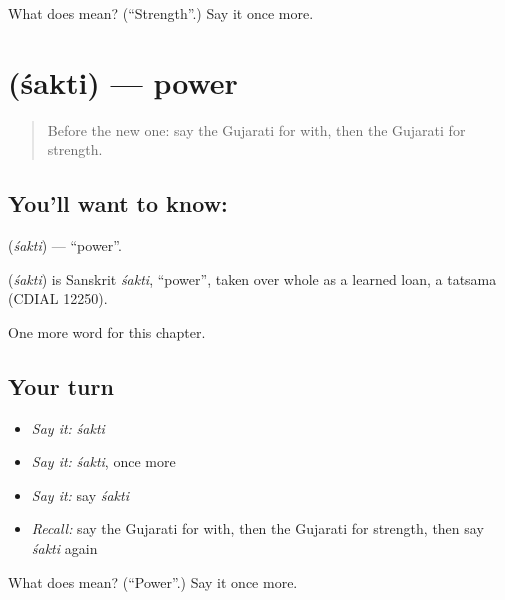 \begin{tcolorbox}[breakable,colback=teal!4,colframe=teal!35!black,title={Before you move on}]
What does  mean? (\textquotedblleft{}Strength\textquotedblright{}.) Say it once more.
\end{tcolorbox}
\section[\texorpdfstring{\gu{શક્તિ} (śakti)}{શક્તિ (śakti)}]{ (śakti) — power}

\label{lesson:GU-C102-sakti}



\begin{quote}
Before the new one: say the Gujarati for with, then the Gujarati for strength.
\end{quote}

\subsection*{You'll want to know: }
\textbf{} (\emph{śakti}) — \textquotedblleft{}power\textquotedblright{}.

\begin{cousinweb}
\textbf{} (\emph{śakti}) is Sanskrit \emph{śakti}, \textquotedblleft{}power\textquotedblright{}, taken over whole as a learned loan, a tatsama (CDIAL 12250).
\end{cousinweb}

\begin{grammarlens}[title={What you've built}]
One more word for this chapter.
\end{grammarlens}

\subsection*{Your turn}
\begin{itemize}
\raggedright
  \item \emph{Say it:} \emph{śakti}
  \item \emph{Say it:} \emph{śakti}, once more
  \item \emph{Say it:} say \emph{śakti}
  \item \emph{Recall:} say the Gujarati for with, then the Gujarati for strength, then say \emph{śakti} again
\end{itemize}

\begin{tcolorbox}[breakable,colback=teal!4,colframe=teal!35!black,title={Before you move on}]
What does  mean? (\textquotedblleft{}Power\textquotedblright{}.) Say it once more.
\end{tcolorbox}
